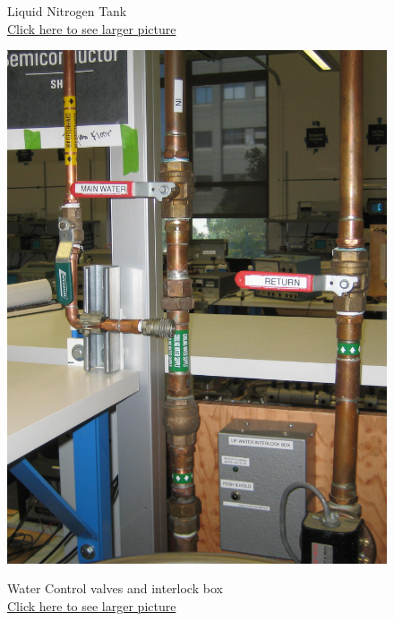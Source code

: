 \documentclass{../lab}
\begin{document}
\begin{figure}[!htb]
  \caption{Liquid Nitrogen Tank \\
  \href{http://experimentationlab.berkeley.edu/sites/default/files/images/SHE_LN-2_Crop_3542.jpg.jpg}{Click here to see larger picture}}
  \label{fig:SHE_LN-2_Crop_3542.jpg}
\endminipage\hfill
{}
  \href{http://experimentationlab.berkeley.edu/sites/default/files/images/SHE_Water_Crop_3544.jpg}{\includegraphics[width=\linewidth,keepaspectratio]{images/SHE_Water_Crop_3544.jpg}}
  \caption{Water Control valves and interlock box \\ \href{http://experimentationlab.berkeley.edu/sites/default/files/images/SHE_Water_Crop_3544.jpg}{Click here to see larger picture}}\label{fig:SHE_Water_Crop_3544.jpg}
\endminipage\hfill
{}

\end{figure}
\end{document}
